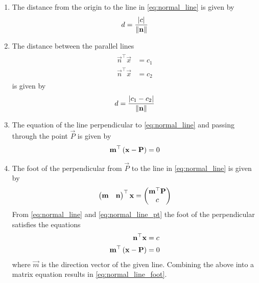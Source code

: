 \documentclass[journal,12pt,twocolumn]{IEEEtran}
\renewcommand\thesection{\arabic{section}}
\renewcommand\thesubsection{\thesection.\arabic{subsection}}
\begin{document}
\begin{enumerate}[label=\thesubsection.\arabic*.,ref=\thesubsection.\theenumi]
	\item The distance from the origin to the line  in 
	\eqref{eq:normal_line}
	is given by 
\begin{align}
	\label{eq:dist_line_2d_orig}
	d = \frac{\left\vert   c \right\vert}{\left\lVert\mathbf{n}\right\rVert}	
\end{align}
\item The distance between the parallel lines 
\begin{align}
	\label{eq:parallel_lines}
	\begin{split}
		\vec{n}^{\top}\vec{x} &= c_1
		\\
		\vec{n}^{\top}\vec{x} &= c_2
	\end{split}
\end{align}
is given by 
\begin{align}
	\label{eq:dist_lines_2d}
	d = \frac{\left\vert   c_1-c_2 \right\vert}{\left\lVert\mathbf{n}\right\rVert}	
\end{align}
\item The equation of the line perpendicular to 
	\eqref{eq:normal_line}
		and passing through the point $\vec{P}$ is given by 
\begin{align}
	\mathbf{m}^{\top}\left(\mathbf{x}-\mathbf{P}\right)  = 0
\end{align}
\item The foot of the perpendicular from $\vec{P}$ to the line in 
	\eqref{eq:normal_line}
	is given by 
\begin{align}
	\label{eq:normal_line_foot}
	\begin{pmatrix} \mathbf{m} & \mathbf{n}\end{pmatrix}^{\top}\mathbf{x}= \begin{pmatrix}\mathbf{m}^{\top}\mathbf{P}\\ c \end{pmatrix}  
\end{align}
% 
\solution From
	\eqref{eq:normal_line} and 
	\eqref{eq:normal_line_pt} 
the foot of the perpendicular satisfies the equations 
\begin{align}
	\mathbf{n}^{\top}\mathbf{x} &= c
	\\
	\mathbf{m}^{\top}\left(\mathbf{x}-\mathbf{P} \right)&=0 
\end{align}
where $\vec{m}$ is the direction vector of the given line.  Combining the above into a matrix equation results in 
	\eqref{eq:normal_line_foot}.
\end{enumerate}
 
\end{document}

